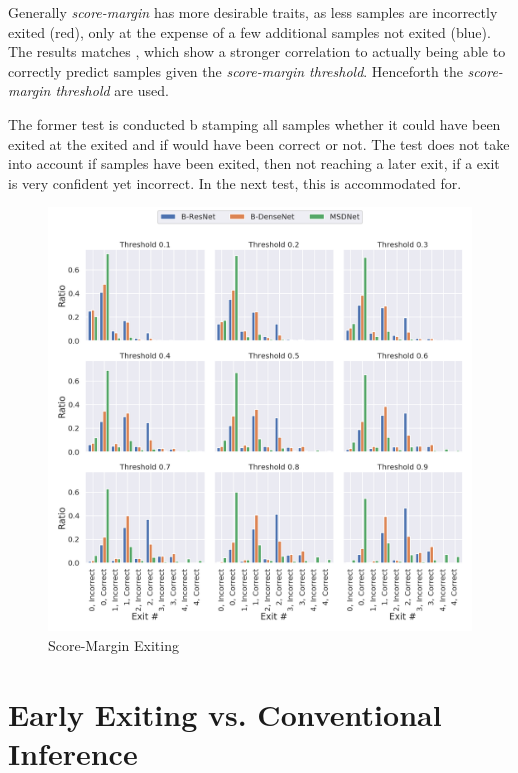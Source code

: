 Generally \emph{score-margin} has more desirable traits, as less samples are incorrectly exited (red), only at the expense of a few additional samples not exited ({\color{sns-blue}blue}). The results matches \cite{park_big/little_2015}, which show a stronger correlation to actually being able to correctly predict samples given the \emph{score-margin threshold}. Henceforth the \emph{score-margin threshold} are used.

The former test is conducted b stamping all samples whether it could have been exited at the exited and if would have been correct or not. The test does not take into account if samples have been exited, then not reaching a later exit, if a exit is very confident yet incorrect. In the next test, this is accommodated for.

\begin{figure}
	\centering
	\includegraphics[width=\linewidth]{figures/threshold_plots/inference_threshold_test}
	\caption{Score-Margin Exiting}
	\label{fig:inferencethresholdtest}
\end{figure}



\section{Early Exiting vs. Conventional Inference}

